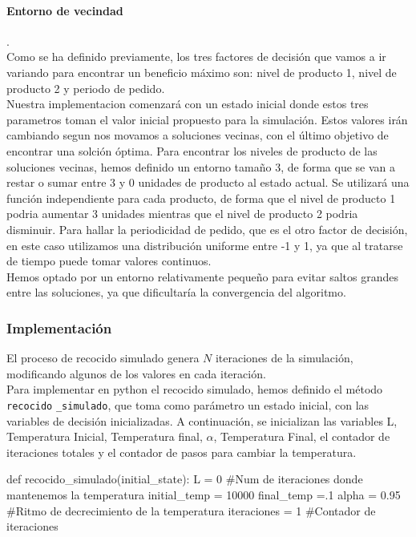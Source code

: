 \documentclass[a4paper,12pt]{article}
\begin{document}
	\paragraph{Entorno de vecindad}.\\	
	
	
	Como se ha definido previamente, los tres factores de decisión que vamos a ir variando para encontrar un beneficio máximo son: nivel de producto 1, nivel de producto 2 y periodo de pedido. \\
	Nuestra implementacion comenzará con un estado inicial donde estos tres parametros toman el valor inicial propuesto para la simulación. Estos valores irán cambiando segun nos movamos a soluciones vecinas, con el último objetivo de 
	encontrar una solción óptima. 
	Para encontrar los niveles de producto de las soluciones vecinas, hemos definido un entorno tamaño 3, de forma que se van a restar o sumar entre 3 y 0 unidades de producto al estado actual. Se utilizará una función 
	independiente para cada producto, de forma que el nivel de producto 1 podria aumentar 3 unidades mientras que el nivel de producto 2 podria disminuir. 
	Para hallar la periodicidad de pedido, que es el otro factor de decisión, en este caso utilizamos una distribución uniforme entre -1 y 1, ya que al tratarse de tiempo puede tomar valores continuos. \\
	Hemos optado por un entorno relativamente pequeño para evitar saltos grandes entre las soluciones, ya que dificultaría la convergencia del algoritmo. 
	
	\subsubsection{Implementación}
	El proceso de recocido simulado genera $N$ iteraciones de la simulación, modificando algunos de los valores en cada iteración.\\
	
	Para implementar en python el recocido simulado, hemos definido el método \texttt{recocido} \texttt{\_simulado}, que toma como parámetro un estado inicial, con las variables de  	decisión inicializadas. A continuación, se inicializan las variables L, Temperatura Inicial, Temperatura final, $\alpha$, Temperatura Final, el contador de iteraciones totales y el contador de pasos para cambiar la temperatura. \\

	\begin{python}
def recocido_simulado(initial_state):
	L = 0 #Num de iteraciones donde mantenemos la temperatura
	initial_temp = 10000 
	final_temp =.1
	alpha = 0.95 #Ritmo de decrecimiento de la temperatura
	iteraciones = 1 #Contador de iteraciones
	\end{python}
\end{document}
